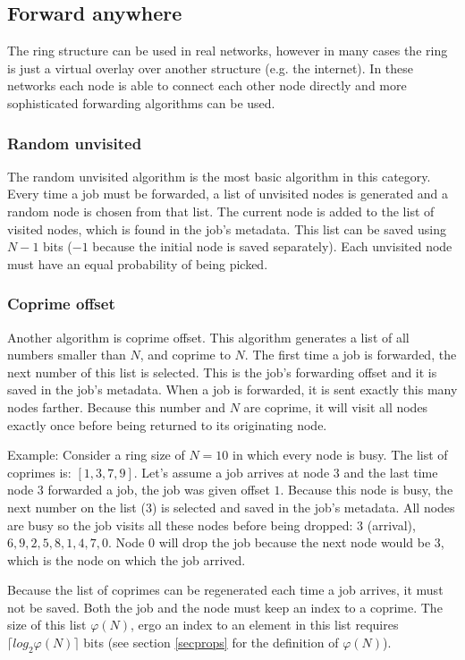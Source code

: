 \documentclass[10pt,a4paper]{article}
\begin{document}
\subsection{Forward anywhere}
The ring structure can be used in real networks, however in many cases the ring is just a virtual overlay over another structure (e.g. the internet). In these networks each node is able to connect each other node directly and more sophisticated forwarding algorithms can be used.

\subsubsection*{Random unvisited}
The random unvisited algorithm is the most basic algorithm in this category. Every time a job must be forwarded, a list of unvisited nodes is generated and a random node is chosen from that list. The current node is added to the list of visited nodes, which is found in the job's metadata. This list can be saved using $N-1$ bits ($-1$ because the initial node is saved separately). Each unvisited node must have an equal probability of being picked.

\subsubsection*{Coprime offset}
Another algorithm is coprime offset. This algorithm generates a list of all numbers smaller than $N$, and coprime to $N$. The first time a job is forwarded, the next number of this list is selected. This is the job's forwarding offset and it is saved in the job's metadata. When a job is forwarded, it is sent exactly this many nodes farther. Because this number and $N$ are coprime, it will visit all nodes exactly once before being returned to its originating node. 

Example:
Consider a ring size of $N=10$ in which every node is busy. The list of coprimes is: $[1, 3, 7, 9]$. Let's assume a job arrives at node $3$ and the last time node $3$ forwarded a job, the job was given offset $1$.
Because this node is busy, the next number on the list ($3$) is selected and saved in the job's metadata. All nodes are busy so the job visits all these nodes before being dropped: $3$ (arrival), $6, 9, 2, 5, 8, 1, 4, 7, 0$. Node $0$ will drop the job because the next node would be $3$, which is the node on which the job arrived.

Because the list of coprimes can be regenerated each time a job arrives, it must not be saved. Both the job and the node must keep an index to a coprime. The size of this list $\varphi(N)$, ergo an index to an element in this list requires $\lceil log_2 \varphi(N) \rceil$ bits (see section \ref{secprops} for the definition of $\varphi(N)$).
\end{document}
